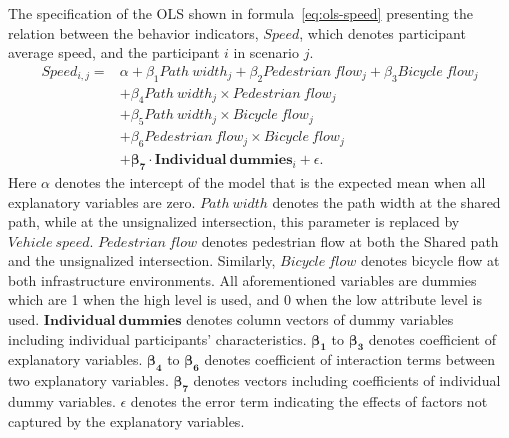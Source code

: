 \documentclass[3p,authoryear]{elsarticle}
\begin{document}
The specification of the OLS shown in formula~\eqref{eq:ols-speed} presenting
the relation between the behavior indicators, $Speed$, which denotes participant
average speed, and the participant $i$ in scenario $j$.
%
\begin{equation}\label{eq:ols-speed}
  \begin{aligned}
    Speed_{i,j} ={}& \alpha + \beta_1 Path\ width_j
                     + \beta_2 Pedestrian\ flow_j
                     + \beta_3 Bicycle\ flow_j\\
                   & + \beta_4 Path\ width_j \times Pedestrian\ flow_j\\
                   & + \beta_5 Path\ width_j \times Bicycle\ flow_j\\
                   & + \beta_6 Pedestrian\ flow_j \times Bicycle\ flow_j\\
                   & + \bm{\beta_7} \cdot
                       \bm{Individual\ dummies}_i + \epsilon .
  \end{aligned}
\end{equation}
%
Here $\alpha$ denotes the intercept of the model that is the expected mean when
all explanatory variables are zero. $Path\ width$ denotes the path width at the
shared path, while at the unsignalized intersection, this parameter is replaced
by $Vehicle\ speed$. $Pedestrian\ flow$ denotes pedestrian flow at both the
Shared path and the unsignalized intersection. Similarly, $Bicycle\ flow$
denotes bicycle flow at both infrastructure environments. All aforementioned
variables are dummies which are 1 when the high level is used, and 0 when the
low attribute level is used. $\bm{Individual\ dummies}$ denotes column
vectors of dummy variables including individual participants' characteristics.
$\bm{\beta_1}$ to $\bm{\beta_3}$ denotes coefficient of
explanatory variables. $\bm{\beta_4}$ to $\bm{\beta_6}$ denotes
coefficient of interaction terms between two explanatory variables.
$\bm{\beta_7}$ denotes vectors including coefficients of individual
dummy variables. $\epsilon$ denotes the error term indicating the effects of
factors not captured by the explanatory variables.
\end{document}
